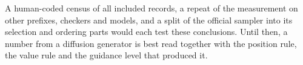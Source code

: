 A human-coded census of all included records, a repeat of the measurement on other prefixes, checkers and models, and a split of the official sampler into its selection and ordering parts would each test these conclusions. Until then, a number from a diffusion generator is best read together with the position rule, the value rule and the guidance level that produced it. %
